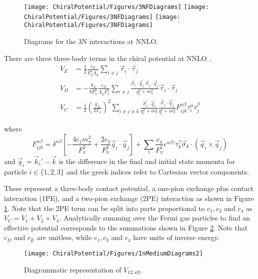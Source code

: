 \begin{figure}
\centering
\texttt{[image: ChiralPotential/Figures/3NFDiagrams]}
\texttt{[image: ChiralPotential/Figures/3NFDiagrams]}
\texttt{[image: ChiralPotential/Figures/3NFDiagrams]}
\caption{\label{fig:3NF}Diagrams for the 3N interactions at NNLO.}
\end{figure}

There are three three-body terms in the chiral potential at NNLO \cite{PhysRevC.66.064001}. 
\begin{align}
V_E&=\frac{1}{2}\frac{c_E }{F_\pi^4\Lambda_\chi}\sum_{i\neq j} \vec{\tau}_i\cdot\vec{\tau}_j \label{eq:V_E} \\
V_D&=-\frac{ g_A}{8F_\pi^2}\frac{c_D}{\Lambda_\chi F_\pi^2}\sum_{i\neq j } \frac{ \vec{\sigma}_i\cdot\vec{q}_j\:\vec{\sigma}_j\cdot\vec{q}_j }{q^2_j+m_\pi^2} \vec{\tau}_i\cdot\vec{\tau}_j \label{eq:V_D}\\
V_{C} &= \frac{1}{2}\left(\frac{g_A}{2F_\pi}\right)^2\sum_{i\neq j \neq k} \frac{ \vec{\sigma}_i\cdot\vec{q}_i}{q_i^2+m_\pi^2}\frac{\vec{\sigma}_j\cdot\vec{q}_j }{q^2_j+m_\pi^2} F_{ijk}^{\alpha\beta}\tau_i^{\alpha}\tau_j^\beta \label{eq:V_C}
\end{align}

where 
\begin{equation}
F_{ijk}^{\alpha\beta}=\delta^{\alpha \beta}\left[-\frac{4c_1m_\pi^2}{F_\pi^2}+\frac{2c_3}{F_\pi^2}\vec{q}_i\cdot\vec{q}_j\right]+\sum_\gamma\frac{c_4}{F_\pi^2}\epsilon^{\alpha\beta\gamma}\tau^\gamma_k\vec{\sigma}_k\cdot\left(\vec{q}_i\times\vec{q}_j\right)
\end{equation}
and $\vec{q}_i=\vec{k}_i' - \vec{k}$ is the difference in the final and initial state momenta for particle $i \in \{1,2,3\}$ and the greek indices refer to Cartesian vector components.

These represent a three-body contact potential, a one-pion exchange plus contact interaction (1PE), and a two-pion exchange (2PE) interaction as shown in Figure \ref{fig:3NF}. Note that the 2PE term can be split into parts proportional to $c_1, c_3$ and $c_4$ as $V_C=V_1+V_2+V_4$. Analytically summing over the Fermi gas particles to find an effective potential corresponds to the summations shown in Figure \ref{fig:eff-diagram}. Note that $c_D$ and $c_E$ are unitless, while $c_1, c_3$ and $c_4$ have units of inverse energy. 

\begin{figure}
\texttt{[image: ChiralPotential/Figures/InMediumDiagrams2]}
\caption{\label{fig:eff-diagram} Diagrammatic representation of $V_{12,\text{eff}}$.}
\end{figure}

